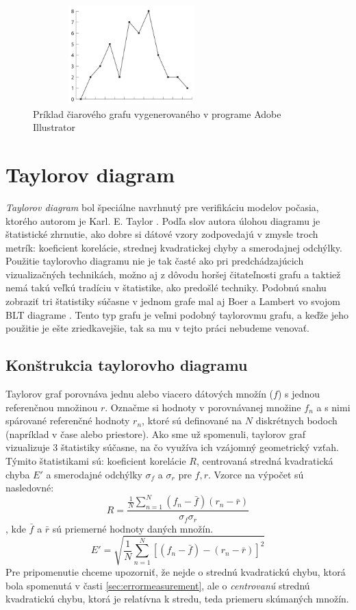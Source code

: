 \begin{figure}
	\centering
	\includegraphics[width = 3in, height=1.5in]{linegraph}
	\caption{Príklad čiarového grafu vygenerovaného v programe Adobe Illustrator}
	\label{fig:linegraph}
\end{figure}

\section{Taylorov diagram}
\textit{Taylorov diagram} bol špeciálne navrhnutý pre verifikáciu modelov počasia, ktorého autorom je Karl. E. Taylor \cite{Taylor}. Podľa slov autora úlohou diagramu je štatistické zhrnutie, ako dobre si dátové vzory zodpovedajú v zmysle troch metrík: koeficient korelácie, strednej kvadratickej chyby a smerodajnej odchýlky. Použitie taylorovho diagramu nie je tak časté ako pri predchádzajúcich vizualizačných technikách, možno aj z dôvodu horšej čitateľnosti grafu a taktiež nemá takú veľkú tradíciu v štatistike, ako predošlé techniky. Podobnú snahu zobraziť tri štatistiky súčasne v jednom grafe mal aj Boer a Lambert vo svojom BLT diagrame \cite{Boer}. Tento typ grafu je veľmi podobný taylorovmu grafu, a keďže jeho použitie je ešte zriedkavejšie, tak sa mu v tejto práci nebudeme venovať.
  
\subsection{Konštrukcia taylorovho diagramu}
Taylorov graf porovnáva jednu alebo viacero dátových množín ($ f $) s jednou referenčnou množinou $ r $. Označme si hodnoty v porovnávanej množine $ f_{n} $ a s nimi spárované referenčné hodnoty $ r_{n} $, ktoré sú definované na $ N $ diskrétnych bodoch (napríklad v čase alebo priestore). Ako sme už spomenuli, taylorov graf vizualizuje 3 štatistiky súčasne, na čo využíva ich vzájomný geometrický vzťah. Týmito štatistikami sú: koeficient korelácie $ R $, centrovaná stredná kvadratická chyba $ E' $ a smerodajné odchýlky $ \sigma_{f} $ a $ \sigma_{r} $ pre $ f, r $.  Vzorce na výpočet sú nasledovné:
\[
	R = \dfrac{\frac{1}{N} \sum_{n=1}^{N}(f_{n} - \bar{f})(r_{n} - \bar{r})  }{\sigma_{f}\sigma_{r}}
\]
, kde $ \bar{f} $ a $ \bar{r} $ sú priemerné hodnoty daných množín.
\[
	E' = \sqrt{\frac{1}{N} \sum_{n=1}^{N}[(f_{n} - \bar{f}) - (r_{n} - \bar{r})]^2 }
\]
Pre pripomenutie chceme upozorniť, že nejde o strednú kvadratickú chybu, ktorá bola spomenutá v časti \ref{sec:errormeasurement}, ale o \textit{centrovanú} strednú kvadratickú chybu, ktorá je relatívna k stredu, teda priemeru skúmaných množín.

